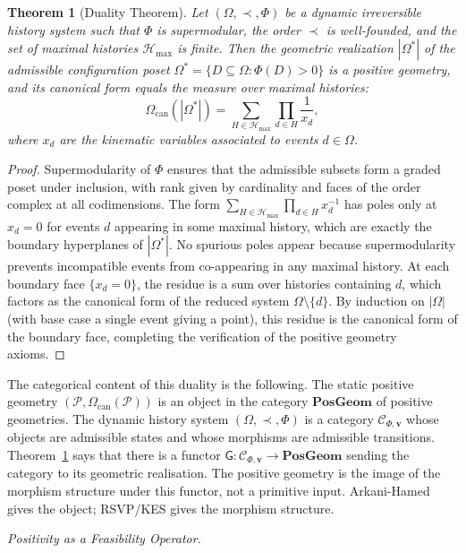 \documentclass[12pt, oneside]{amsart}
\theoremstyle{plain}
\newtheorem{theorem}{Theorem}[section]
\theoremstyle{definition}
\theoremstyle{remark}
\newcommand{\Phif}{\Phi}
\newcommand{\OmKS}{\Omega}
\newcommand{\CF}{\Omega_{\mathrm{can}}}
\newcommand{\PG}{\mathbf{PosGeom}}
\newcommand{\Ccat}{\mathcal{C}_{\Phi,\mathbf{v}}}
\newcommand{\Gfun}{\mathsf{G}}
\newcommand{\Hmax}{\mathcal{H}_{\max}}
\begin{document}
\begin{theorem}[Duality Theorem]
\label{thm:duality}
Let $(\OmKS, \prec, \Phif)$ be a dynamic irreversible history system such that $\Phif$ is supermodular, the order $\prec$ is well-founded, and the set of maximal histories $\Hmax$ is finite. Then the geometric realization $|\OmKS^*|$ of the admissible configuration poset $\OmKS^* = \{D \subseteq \OmKS : \Phif(D) > 0\}$ is a positive geometry, and its canonical form equals the measure over maximal histories:
\[
  \CF(|\OmKS^*|) = \sum_{H \in \Hmax} \prod_{d \in H} \frac{1}{x_d},
\]
where $x_d$ are the kinematic variables associated to events $d \in \OmKS$.
\end{theorem}

\begin{proof}
Supermodularity of $\Phif$ ensures that the admissible subsets form a graded poset under inclusion, with rank given by cardinality and faces of the order complex at all codimensions. The form $\sum_{H \in \Hmax} \prod_{d \in H} x_d^{-1}$ has poles only at $x_d = 0$ for events $d$ appearing in some maximal history, which are exactly the boundary hyperplanes of $|\OmKS^*|$. No spurious poles appear because supermodularity prevents incompatible events from co-appearing in any maximal history. At each boundary face $\{x_d = 0\}$, the residue is a sum over histories containing $d$, which factors as the canonical form of the reduced system $\OmKS \setminus \{d\}$. By induction on $|\OmKS|$ (with base case a single event giving a point), this residue is the canonical form of the boundary face, completing the verification of the positive geometry axioms.
\end{proof}

The categorical content of this duality is the following. The static positive geometry $(\mathcal{P}, \CF(\mathcal{P}))$ is an object in the category $\PG$ of positive geometries. The dynamic history system $(\OmKS, \prec, \Phif)$ is a category $\Ccat$ whose objects are admissible states and whose morphisms are admissible transitions. Theorem~\ref{thm:duality} says that there is a functor $\Gfun: \Ccat \to \PG$ sending the category to its geometric realisation. The positive geometry is the image of the morphism structure under this functor, not a primitive input. Arkani-Hamed gives the object; RSVP/KES gives the morphism structure.

\medskip\noindent\textit{Positivity as a Feasibility Operator.}
\end{document}
